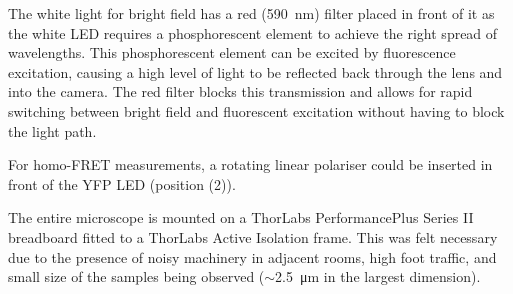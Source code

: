 \documentclass[../main.tex]{subfiles}
\begin{document}
The white light for bright field has a red (\SI{590}{\nano\meter}) filter placed in front of it as the white LED requires a phosphorescent element to achieve the right spread of wavelengths. This phosphorescent element can be excited by fluorescence excitation, causing a high level of light to be reflected back through the lens and into the camera. The red filter blocks this transmission and allows for rapid switching between bright field and fluorescent excitation without having to block the light path.

For homo-FRET measurements, a rotating linear polariser could be inserted in front of the YFP LED (position (2)).

The entire microscope is mounted on a ThorLabs PerformancePlus Series II breadboard fitted to a ThorLabs Active Isolation frame. This was felt necessary due to the presence of noisy machinery in adjacent rooms, high foot traffic, and small size of the samples being observed (\(\sim\)\SI{2.5}{\micro\meter} in the largest dimension).
\end{document}
